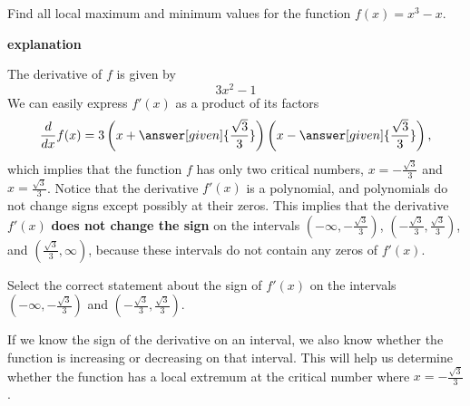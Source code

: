 \documentclass{ximera}
\begin{document}
\begin{example}

Find all local maximum and minimum values for the function 
$f(x)=x^3-x$. 


\textbf{\textcolor{red!75!green}{explanation}} 


The derivative of $f$ is given by
\[
3x^2 - 1
\] 
We can easily express  $f'(x)$ as a product of its factors
\[
\frac{d}{dx}
f(x)=3\left(x+\answer[given]{\frac{\sqrt{3}}{3}}\right)\left(x-\answer[given]{\frac{\sqrt{3}}{3}}\right),
\] 
which implies that the function $f$ has only two critical numbers,
$x=-\frac{\sqrt{3}}{3}$ and $x=\frac{\sqrt{3}}{3}$. Notice that the
derivative $f'(x)$ is a polynomial, and polynomials do not change
signs except possibly at their zeros. This implies that the derivative
$f'(x)$ \textbf{does not change the sign} on the intervals
$\left(-\infty,-\frac{\sqrt{3}}{3}\right)$,
$\left(-\frac{\sqrt{3}}{3},\frac{\sqrt{3}}{3}\right)$, and
$\left(\frac{\sqrt{3}}{3},\infty\right)$, because these intervals do not contain
any zeros of $f'(x)$. 
 
\begin{question}
Select the correct statement about the sign of $f'(x)$ on the
intervals $\left(-\infty,-\frac{\sqrt{3}}{3}\right)$ and
$\left(-\frac{\sqrt{3}}{3},\frac{\sqrt{3}}{3}\right)$. 
\begin{multipleChoice}
\end{multipleChoice}
  \end{question}








  If we know the sign of the derivative on an interval, we also know whether the function is increasing or decreasing on that interval. This will help us determine whether the function has a local extremum at the critical number  where $x=-\frac{\sqrt{3}}{3}$. 
  \begin{question}


\end{question}
\end{example}
\end{document}
